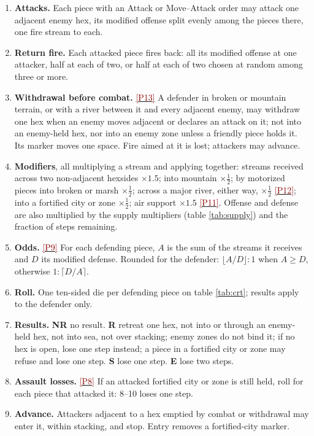 \documentclass[11pt]{article}
\makeatletter
\newcommand{\ptest}[1]{\hyperlink{ptest}{\textcolor{darkred}{[P#1]}}}
\renewcommand{\subsection}{\@startsection{subsection}{2}{\z@}{-1.5ex \@plus -.3ex}{.5ex}{\normalfont\large\bfseries\color{myBlue1}}}
\makeatother
\begin{document}
\subsection{Land combat}\label{sub:combat}
\begin{enumerate}
\item \textbf{Attacks.} Each piece with an Attack or Move--Attack order may attack one adjacent enemy hex, its modified offense split evenly among the pieces there, one fire stream to each.
\item \textbf{Return fire.} Each attacked piece fires back: all its modified offense at one attacker, half at each of two, or half at each of two chosen at random among three or more.
\item \textbf{Withdrawal before combat.} \ptest{13} A defender in broken or mountain terrain, or with a river between it and every adjacent enemy, may withdraw one hex when an enemy moves adjacent or declares an attack on it; not into an enemy-held hex, nor into an enemy zone unless a friendly piece holds it. Its marker moves one space. Fire aimed at it is lost; attackers may advance.
\item \textbf{Modifiers}, all multiplying a stream and applying together: streams received across two non-adjacent hexsides $\times 1.5$; into mountain $\times\tfrac{1}{2}$; by motorized pieces into broken or marsh $\times\tfrac{1}{2}$; across a major river, either way, $\times\tfrac{1}{2}$ \ptest{12}; into a fortified city or zone $\times\tfrac{1}{2}$; air support $\times 1.5$ \ptest{11}. Offense and defense are also multiplied by the supply multipliers (table \ref{tab:supply}) and the fraction of steps remaining.
\item \textbf{Odds.} \ptest{9} For each defending piece, $A$ is the sum of the streams it receives and $D$ its modified defense. Rounded for the defender: $\lfloor A/D\rfloor{:}1$ when $A\ge D$, otherwise $1{:}\lceil D/A\rceil$.
\item \textbf{Roll.} One ten-sided die per defending piece on table \ref{tab:crt}; results apply to the defender only.
\item \textbf{Results.} \textbf{NR} no result. \textbf{R} retreat one hex, not into or through an enemy-held hex, not into sea, not over stacking; enemy zones do not bind it; if no hex is open, lose one step instead; a piece in a fortified city or zone may refuse and lose one step. \textbf{S} lose one step. \textbf{E} lose two steps.
\item \textbf{Assault losses.} \ptest{8} If an attacked fortified city or zone is still held, roll for each piece that attacked it: 8--10 loses one step.
\item \textbf{Advance.} Attackers adjacent to a hex emptied by combat or withdrawal may enter it, within stacking, and stop. Entry removes a fortified-city marker.
\end{enumerate}
\end{document}
